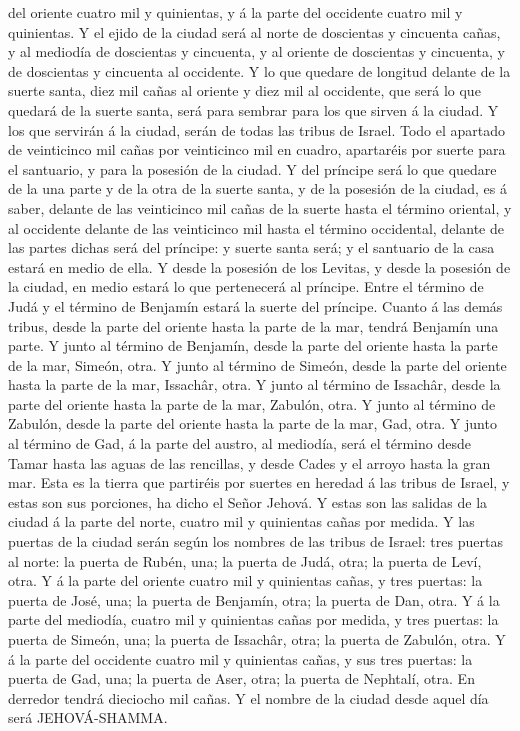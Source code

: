 del oriente cuatro mil y quinientas, y á la parte del occidente cuatro
mil y quinientas.  Y el ejido de la ciudad será al norte
de doscientas y cincuenta cañas, y al mediodía de doscientas y
cincuenta, y al oriente de doscientas y cincuenta, y de doscientas y
cincuenta al occidente.  Y lo que quedare de longitud
delante de la suerte santa, diez mil cañas al oriente y diez mil al
occidente, que será lo que quedará de la suerte santa, será para sembrar
para los que sirven á la ciudad.  Y los que servirán á la
ciudad, serán de todas las tribus de Israel.  Todo el
apartado de veinticinco mil cañas por veinticinco mil en cuadro,
apartaréis por suerte para el santuario, y para la posesión de la
ciudad.  Y del príncipe será lo que quedare de la una
parte y de la otra de la suerte santa, y de la posesión de la ciudad, es
á saber, delante de las veinticinco mil cañas de la suerte hasta el
término oriental, y al occidente delante de las veinticinco mil hasta el
término occidental, delante de las partes dichas será del príncipe: y
suerte santa será; y el santuario de la casa estará en medio de ella.
 Y desde la posesión de los Levitas, y desde la posesión
de la ciudad, en medio estará lo que pertenecerá al príncipe. Entre el
término de Judá y el término de Benjamín estará la suerte del príncipe.
 Cuanto á las demás tribus, desde la parte del oriente
hasta la parte de la mar, tendrá Benjamín una parte.  Y
junto al término de Benjamín, desde la parte del oriente hasta la parte
de la mar, Simeón, otra.  Y junto al término de Simeón,
desde la parte del oriente hasta la parte de la mar, Issachâr, otra.
 Y junto al término de Issachâr, desde la parte del
oriente hasta la parte de la mar, Zabulón, otra.  Y junto
al término de Zabulón, desde la parte del oriente hasta la parte de la
mar, Gad, otra.  Y junto al término de Gad, á la parte
del austro, al mediodía, será el término desde Tamar hasta las aguas de
las rencillas, y desde Cades y el arroyo hasta la gran mar.
 Esta es la tierra que partiréis por suertes en heredad á
las tribus de Israel, y estas son sus porciones, ha dicho el Señor
Jehová.  Y estas son las salidas de la ciudad á la parte
del norte, cuatro mil y quinientas cañas por medida.  Y
las puertas de la ciudad serán según los nombres de las tribus de
Israel: tres puertas al norte: la puerta de Rubén, una; la puerta de
Judá, otra; la puerta de Leví, otra.  Y á la parte del
oriente cuatro mil y quinientas cañas, y tres puertas: la puerta de
José, una; la puerta de Benjamín, otra; la puerta de Dan, otra.
 Y á la parte del mediodía, cuatro mil y quinientas cañas
por medida, y tres puertas: la puerta de Simeón, una; la puerta de
Issachâr, otra; la puerta de Zabulón, otra.  Y á la parte
del occidente cuatro mil y quinientas cañas, y sus tres puertas: la
puerta de Gad, una; la puerta de Aser, otra; la puerta de Nephtalí,
otra.  En derredor tendrá dieciocho mil cañas. Y el
nombre de la ciudad desde aquel día será JEHOVÁ-SHAMMA.
